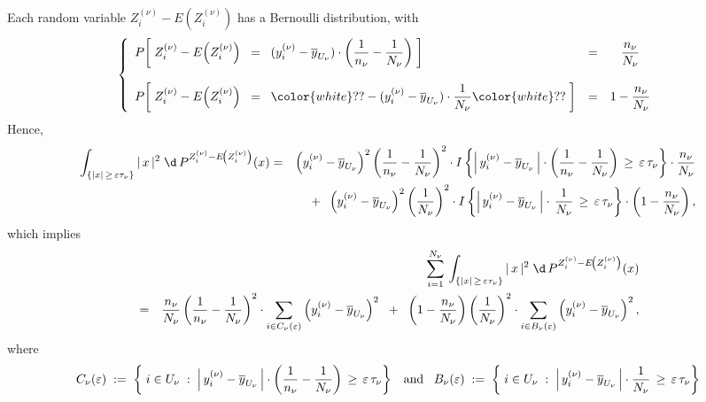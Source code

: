 Each random variable $Z^{(\nu)}_{i} - E\!\left(Z^{(\nu)}_{i}\right)$ has a Bernoulli distribution, with
\begin{equation*}
\left\{
\begin{array}{lcc}
P\!\left[\;
Z^{(\nu)}_{i} - E\!\left(Z^{(\nu)}_{i}\right) \;\;=\;\; (y^{(\nu)}_{i} - \overline{y}_{U_{\nu}})\cdot\left(\dfrac{1}{n_{\nu}} - \dfrac{1}{N_{\nu}}\right)
\;\right]
& = & \dfrac{n_{\nu}}{N_{\nu}}
\\ \\
P\!\left[\;
Z^{(\nu)}_{i} - E\!\left(Z^{(\nu)}_{i}\right) \;\;=\;\;
{\color{white}??}
-(y^{(\nu)}_{i} - \overline{y}_{U_{\nu}})\cdot\dfrac{1}{N_{\nu}}
{\color{white}??}\;\right]
& = & 1 - \dfrac{n_{\nu}}{N_{\nu}}
\end{array}
\right.
\end{equation*}
Hence,
\begin{eqnarray*}
\int_{\left\{\vert x\vert \,\geq\, \varepsilon\tau_{\nu}\right\}}
\vert\,x\,\vert^{2}\;
\d\,P^{Z^{(\nu)}_{i} - E\!\left(Z^{(\nu)}_{i}\right)}(x)
&=&
\left(y^{(\nu)}_{i} - \overline{y}_{U_{\nu}}\right)^{2}\left(\dfrac{1}{n_{\nu}} - \dfrac{1}{N_{\nu}}\right)^{2} \cdot
I\left\{
\left\vert\,y^{(\nu)}_{i} - \overline{y}_{U_{\nu}}\,\right\vert
\cdot
\left(\frac{1}{n_{\nu}} - \frac{1}{N_{\nu}}\right)
\,\geq\,\varepsilon\,\tau_{\nu}
\right\}
\cdot
\dfrac{n_{\nu}}{N_{\nu}}
\\
&&
+\;\;
\left(y^{(\nu)}_{i} - \overline{y}_{U_{\nu}}\right)^{2}\left(\dfrac{1}{N_{\nu}}\right)^{2} \cdot
I\left\{
\left\vert\,y^{(\nu)}_{i} - \overline{y}_{U_{\nu}}\,\right\vert
\cdot\,
\frac{1}{N_{\nu}}
\,\geq\,\varepsilon\,\tau_{\nu}
\right\}
\cdot
\left(1 - \dfrac{n_{\nu}}{N_{\nu}}\right),
\end{eqnarray*}
which implies
\begin{eqnarray*}
&&
\sum_{i=1}^{N_{\nu}}\,
\int_{\left\{\vert x\vert \,\geq\, \varepsilon\tau_{\nu}\right\}}
\vert\,x\,\vert^{2}\;
\d\,P^{Z^{(\nu)}_{i} - E\!\left(Z^{(\nu)}_{i}\right)}(x)
\\
&=&
\dfrac{n_{\nu}}{N_{\nu}}\left(\dfrac{1}{n_{\nu}}-\dfrac{1}{N_{\nu}}\right)^{2}
\cdot\sum_{i\in C_{\nu}(\varepsilon)}\left(y^{(\nu)}_{i}-\overline{y}_{U_{\nu}}\right)^{2}
\;\; + \;\;
\left(1-\dfrac{n_{\nu}}{N_{\nu}}\right)
\left(\dfrac{1}{N_{\nu}}\right)^{2}
\cdot\sum_{i\in B_{\nu}(\varepsilon)}\left(y^{(\nu)}_{i}-\overline{y}_{U_{\nu}}\right)^{2},
\end{eqnarray*}
where
\begin{equation*}
C_{\nu}(\varepsilon)
\; := \;
\left\{
\; i \in U_{\nu} \;:\;
\left\vert\,y^{(\nu)}_{i} - \overline{y}_{U_{\nu}}\,\right\vert
\cdot
\left(\frac{1}{n_{\nu}} - \frac{1}{N_{\nu}}\right)
\,\geq\,\varepsilon\,\tau_{\nu}
\right\}
\;\;\;\textnormal{and}\;\;\;
B_{\nu}(\varepsilon)
\; := \;
\left\{
\; i \in U_{\nu} \;:\;
\left\vert\,y^{(\nu)}_{i} - \overline{y}_{U_{\nu}}\,\right\vert
\cdot
\dfrac{1}{N_{\nu}}
\,\geq\,\varepsilon\,\tau_{\nu}
\right\}
\end{equation*}
